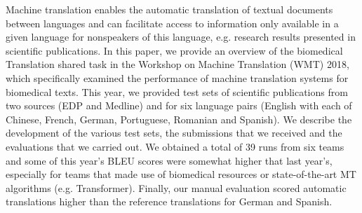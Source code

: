 Machine translation enables the automatic translation of textual documents between languages and can facilitate access to information only available in a given language for nonspeakers of this language, e.g. research results presented in scientific publications. In this paper, we provide an overview of the biomedical Translation shared task in the Workshop on Machine Translation (WMT) 2018, which specifically examined the performance of machine translation systems for biomedical texts. This year, we provided test sets of scientific publications from two sources (EDP and Medline) and for six language pairs (English with each of Chinese, French, German, Portuguese, Romanian and Spanish). We describe the development of the various test sets, the submissions that we received and the evaluations that we carried out. We obtained a total of 39 runs from six teams and some of this year's BLEU scores were somewhat higher that last year's, especially for teams that made use of biomedical resources or state-of-the-art MT algorithms (e.g. Transformer). Finally, our manual evaluation scored automatic translations higher than the reference translations for German and Spanish.
